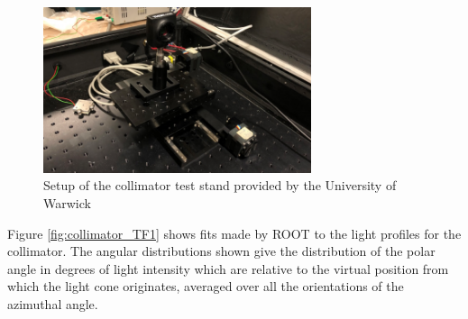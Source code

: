 \begin{figure}
    \centering
    \includegraphics[width=0.7\textwidth]{Figures/coll_test_stand.png}
    \caption{Setup of the collimator test stand provided by the University of Warwick}
    \label{fig:coll_test_stand}
\end{figure}

Figure \ref{fig:collimator_TF1} shows fits made by ROOT to the light profiles for the collimator. The angular distributions shown give the distribution of the polar angle in degrees of light intensity which are relative to the virtual position from which the light cone originates, averaged over all the orientations of the azimuthal angle. 

